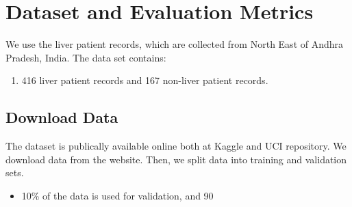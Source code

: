 \documentclass[]{article}
\begin{document}
\section{Dataset and Evaluation Metrics}
\label{sec:dataset}

We use the liver patient records, which are collected from North East of
Andhra Pradesh, India. The data set contains:

\begin{enumerate}
\item 416 liver patient records and 167 non-liver patient records.
\end{enumerate}

\subsection{Download Data}
\label{sec:dd}

The dataset is publically available online both at Kaggle and UCI
repository. We download data from the website. Then, we split data into
training and validation sets.

\begin{itemize}
\item 10\% of the data is used for validation, and 90%
\end{itemize}
\end{document}
